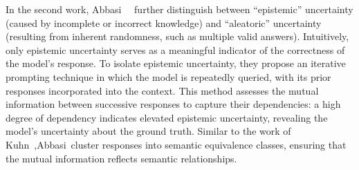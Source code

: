 In the second work, Abbasi~\etal~\cite{abbasi2024believe} further distinguish between ``epistemic'' uncertainty (caused by incomplete or incorrect knowledge) and ``aleatoric'' uncertainty (resulting from inherent randomness, such as multiple valid answers). 
Intuitively, only epistemic uncertainty serves as a meaningful indicator of the correctness of the model's response.
To isolate epistemic uncertainty, they propose an iterative prompting technique in which the model is repeatedly queried, with its prior responses incorporated into the context. 
This method assesses the mutual information between successive responses to capture their dependencies: a high degree of dependency indicates elevated epistemic uncertainty, revealing the model's uncertainty about the ground truth. 
Similar to the work of Kuhn~\etal,Abbasi~\etal cluster responses into semantic equivalence classes, ensuring that the mutual information reflects semantic relationships.






